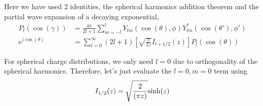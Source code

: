 \documentclass[paper=a4, fontsize=11pt]{article} %
\numberwithin{equation}{section} %
\numberwithin{figure}{section} %
\numberwithin{table}{section} %
\newcommand{\re}{{\mathrm{e}}}
\begin{document}
Here we have used 2 identities, the spherical harmonics addition theorem and the partial wave expansion of a decaying exponential,
\begin{equation}
\begin{split}
P_l(\cos(\gamma)) &= \frac{4\pi}{2l + 1} \sum_{m=-l}^{l} Y_{lm}\left(\cos(\theta),\phi\right)Y_{lm}^*\left(\cos(\theta'),\phi'\right) \\
\re^{z \cos(\theta)} &= \sum_{l=0}^\infty (2l+1)\left[\sqrt{\frac{\pi}{2z}}I_{l+1/2}(z)\right]P_l(\cos(\theta))
\end{split}
\end{equation}


For spherical charge distributions, we only need $l=0$ due to orthogonality of the spherical harmonics. Therefore, let's just evaluate the $l=0, m=0$ term using 
\begin{equation}
I_{1/2}(z) = \sqrt{\frac{2}{(\pi z)}} \mathrm{sinh}(z)\\
\end{equation}
\end{document}
